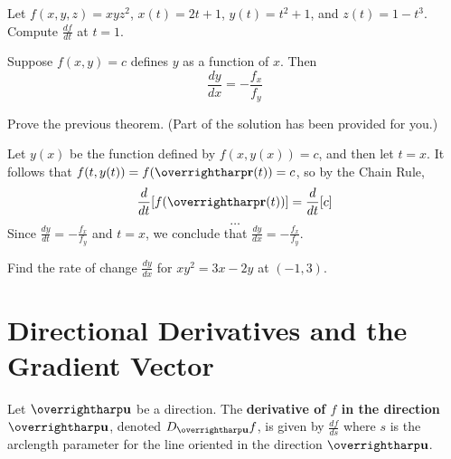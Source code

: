 \documentclass[letterpaper, twoside, 12pt]{book}
\begin{document}
          \begin{problem}
            Let $f(x,y,z)=xyz^2$, $x(t)=2t+1$, $y(t)=t^2+1$,
            and $z(t)=1-t^3$.
            Compute $\frac{df}{dt}$ at $t=1$.
          \end{problem}

          \begin{solution}

          \end{solution}

\begin{theorem}
  Suppose $f(x,y)=c$ defines $y$ as a function of $x$. Then
  \[
    \frac{dy}{dx} = -\frac{f_x}{f_y}
  \]
\end{theorem}

          \begin{problem}
            Prove the previous theorem. (Part of the solution has
            been provided for you.)
          \end{problem}

          \begin{solution}
            Let $y(x)$ be the function defined by $f(x,y(x))=c$, and
            then let $t=x$. It follows that
            $f(t,y(t))=f(\vect{r}(t))=c$, so by the Chain Rule,
            \[
              \frac{d}{dt}[f(\vect{r}(t))]=\frac{d}{dt}[c]
            \]
            \[
              \dots
            \]
            Since $\frac{dy}{dt}=-\frac{f_x}{f_y}$ and $t=x$, we conclude that
            $\frac{dy}{dx}=-\frac{f_x}{f_y}$.
          \end{solution}

          \begin{problem}
            Find the rate of change $\frac{dy}{dx}$ for
            $xy^2=3x-2y$ at $(-1,3)$.
          \end{problem}

          \begin{solution}

          \end{solution}


\section{Directional Derivatives and the Gradient Vector}%

\begin{definition}
  Let $\vect{u}$ be a direction. The
  \textbf{derivative of $f$ in the direction $\vect u$}, denoted
  $D_{\vect{u}}f$, is given by $\frac{df}{ds}$ where $s$ is the
  arclength parameter for the line oriented in the direction $\vect{u}$.
\end{definition}
\end{document}
